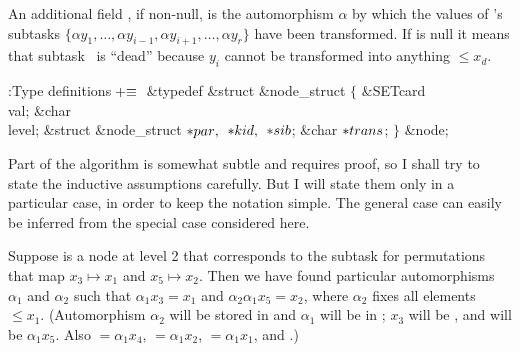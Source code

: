 An additional field , if non-null, is the automorphism $%
\alpha$ by
which the values of 's subtasks $\{\alpha y_1,\ldots,\alpha y_{i-1},
\alpha y_{i+1},\ldots,\alpha y_r\}$ have been transformed. If 
is null it means that subtask~ is ``dead'' because $y_i$ cannot be
transformed into anything $\le x_d$.

\Y\B\4:Type definitions\X${}\mathrel+\equiv{}$\6
\&{typedef} \&{struct} \&{node\_struct} ${}\{{}$\1\6
\&{SETcard} \\{val};\6
\&{char} \\{level};\6
\&{struct} \&{node\_struct} ${}{*}\\{par},{}$ ${}{*}\\{kid},{}$ ${}{*}%
\\{sib}{}$;\6
\&{char} ${}{*}\\{trans}{}$;\2\6
${}\}{}$ \&{node};\par
\fi

Part of the algorithm is somewhat subtle and requires proof, so I shall
try
to state the inductive assumptions carefully. But I will state them only in a
particular case, in order to keep the notation simple. The general case can
easily be inferred from the special case considered here.

Suppose  is a node at level 2 that corresponds to the subtask for
permutations that map $x_3\mapsto x_1$ and $x_5\mapsto x_2$. Then we have
found particular
automorphisms $\alpha_1$ and $\alpha_2$ such that $\alpha_1 x_3=x_1$
and $\alpha_2\alpha_1 x_5=x_2$, where $\alpha_2$ fixes all elements $\le x_1$.
(Automorphism $\alpha_2$ will be stored in  and $%
\alpha_1$ will
be in ; $x_3$ will be , and  will
be $\alpha_1x_5$. Also
${}=\alpha_1x_4$,
${}=\alpha_1x_2$,
${}=\alpha_1x_1$, and
.)

